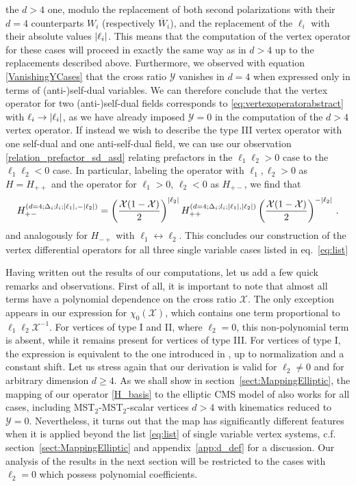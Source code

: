 \documentclass{article}
\def \Dg {\Delta}
\begin{document}
the $d>4$ one, modulo the replacement of both second polarizations with their $d=4$
counterparts $W_i$ (respectively $\overline{W}_i$), and the replacement of the $\ell_i$ with 
their absolute values $\abs{\ell_i}$. This means that the computation of the vertex
operator for these cases will proceed in exactly the same way as in $d>4$ up to the
replacements described above. Furthermore, we observed with equation
\eqref{VanishingYCases} that the cross ratio $\mathcal{Y}$ vanishes in $d=4$ when 
expressed only in terms of (anti-)self-dual variables. We can therefore conclude 
that the vertex operator for two (anti-)self-dual fields corresponds to
\eqref{eq:vertexoperatorabstract} with $\ell_i\rightarrow \abs{\ell_i}$, as we have 
already imposed $\mathcal{Y}=0$ in the computation of the $d>4$ vertex operator. If 
instead we wish to describe the type III vertex operator with one self-dual and one
anti-self-dual field, we can use our observation \eqref{relation_prefactor_sd_asd} relating prefactors in the $\ell_1 \ell_2>0$ case to the $\ell_1 \ell_2<0$ case. 
In particular, labeling the operator with $\ell_1, \ell_2>0$ as $H=H_{++}$ and 
the operator for $\ell_1>0$, $\ell_2<0$ as $H_{+-}$, we find that
\begin{equation}
H_{+-}^{(d=4;\Dg_i;l_i;\abs{\ell_1},-\abs{\ell_2})} = \left(\frac{\mathcal{X}(1-\mathcal{X})}{2}\right)^{\abs{\ell_2}} H_{++}^{(d=4;\Dg_i;l_i;\abs{\ell_1},\abs{\ell_2})}\left(\frac{\mathcal{X}(1-\mathcal{X})}{2}\right)^{-\abs{\ell_2}} \,.
\label{Hpm_to_Hpp}
\end{equation}
and analogously for $H_{-+}$ with $\ell_1\leftrightarrow \ell_2$. This concludes our 
construction of the vertex differential operators for all three single variable
cases listed in eq.\ \eqref{eq:list}

Having written out the results of our computations, let us add a few 
quick remarks and observations. First of all, it is important to note that
almost all terms have a polynomial dependence on the cross ratio $\mathcal{X}$. 
The only exception appears in our expression for $\chi_0(\mathcal{X})$, which 
contains one term proportional to $\ell_1 \ell_2 \mathcal{X}^{-1}$. 
For vertices of type I and II, where $\ell_2 = 0$, this non-polynomial 
term is absent, while it remains present for vertices of type III.  For vertices 
of type I, the expression is equivalent to the one introduced in \cite{Buric:2020dyz}, up to normalization and a constant shift. 
Let us stress again that our derivation is valid for $\ell_2 \neq 0$ and for 
arbitrary dimension $d \geq 4$. As we shall show in 
section~\ref{sect:MappingElliptic}, the mapping of our operator \eqref{H_basis}
to the elliptic CMS model of \cite{etingof2011107} 
also works for all cases, including MST$_2$-MST$_2$-scalar vertices $d > 4$ with 
kinematics reduced to $\mathcal{Y}=0$. Nevertheless, it turns out that the 
map has significantly different features when it is applied beyond the list 
\eqref{eq:list} of single variable vertex systems, c.f. section~\ref{sect:MappingElliptic} and 
appendix~\ref{app:d_def} for a discussion. Our analysis of the results 
in the next section will be restricted to the cases with $\ell_2 = 0$ 
which possess polynomial coefficients. 
\end{document}

